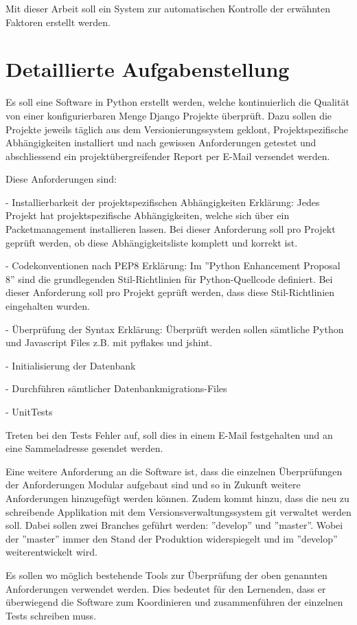 Mit dieser Arbeit soll ein System zur automatischen Kontrolle der erwähnten Faktoren erstellt werden.

\section{Detaillierte Aufgabenstellung}
Es soll eine Software in Python erstellt werden, welche kontinuierlich die Qualität von einer konfigurierbaren Menge Django Projekte überprüft. Dazu sollen die Projekte jeweils täglich aus dem Versionierungssystem geklont, Projektspezifische Abhängigkeiten installiert und nach gewissen Anforderungen getestet und abschliessend ein projektübergreifender Report per E-Mail versendet werden.

Diese Anforderungen sind:

- Installierbarkeit der projektspezifischen Abhängigkeiten
Erklärung: Jedes Projekt hat projektspezifische Abhängigkeiten, welche sich über ein Packetmanagement installieren lassen. Bei dieser Anforderung soll pro Projekt geprüft werden, ob diese Abhängigkeitsliste komplett und korrekt ist.

- Codekonventionen nach PEP8
Erklärung: Im ''Python Enhancement Proposal 8'' sind die grundlegenden Stil-Richtlinien für Python-Quellcode definiert. Bei dieser Anforderung soll pro Projekt geprüft werden, dass diese Stil-Richtlinien eingehalten wurden.

- Überprüfung der Syntax
Erklärung: Überprüft werden sollen sämtliche Python und Javascript Files z.B. mit pyflakes und jshint.

- Initialisierung der Datenbank

- Durchführen sämtlicher Datenbankmigrations-Files

- UnitTests

Treten bei den Tests Fehler auf, soll dies in einem E-Mail festgehalten und an eine Sammeladresse gesendet werden.

Eine weitere Anforderung an die Software ist, dass die einzelnen Überprüfungen der Anforderungen Modular aufgebaut sind und so in Zukunft weitere Anforderungen hinzugefügt werden können. Zudem kommt hinzu, dass die neu zu schreibende Applikation mit dem Versionsverwaltungssystem git verwaltet werden soll. Dabei sollen zwei Branches geführt werden: ''develop'' und ''master''. Wobei der ''master'' immer den Stand der Produktion widerspiegelt und im ''develop'' weiterentwickelt wird.

Es sollen wo möglich bestehende Tools zur Überprüfung der oben genannten Anforderungen verwendet werden. Dies bedeutet für den Lernenden, dass er überwiegend die Software zum Koordinieren und zusammenführen der einzelnen Tests schreiben muss.

